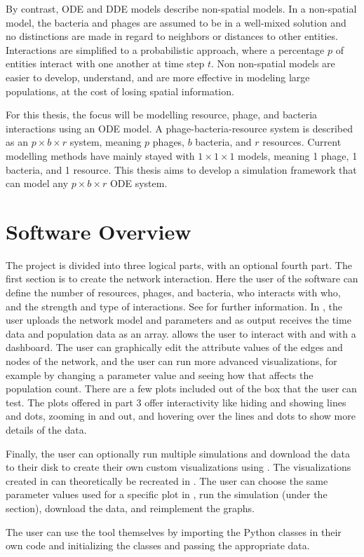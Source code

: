 By contrast, ODE and DDE models describe non-spatial models. 
In a non-spatial model, the bacteria and phages are assumed to be in a well-mixed solution and no distinctions are made in regard to neighbors or distances to other entities. 
Interactions are simplified to a probabilistic approach, where a percentage $p$ of entities interact with one another at time step $t$.
Non non-spatial models are easier to develop, understand, and are more effective in modeling large populations, at the cost of losing spatial information. 

For this thesis, the focus will be modelling resource, phage, and bacteria interactions using an ODE model. 
A phage-bacteria-resource system is described as an $p\times b \times r$ system, meaning $p$ phages, $b$ bacteria, and $r$ resources. 
Current modelling methods have mainly stayed with $1\times 1 \times 1$ models, meaning 1 phage, 1 bacteria, and 1 resource. 
This thesis aims to develop a simulation framework that can model any $p\times b \times r$ ODE system. 

\section{Software Overview}
The project is divided into three logical parts, with an optional fourth part.
The first section is to create the network interaction. 
Here the user of the software can define the number of resources, phages, and bacteria, who interacts with who, and the strength and type of interactions. See  for further information. 
In , the user uploads the network model and parameters and as output receives the time data and population data as an array. 
 allows the user to interact with  and  with a dashboard. 
The user can graphically edit the attribute values of the edges and nodes of the network, and the user can run more advanced visualizations, for example by changing a parameter value and seeing how that affects the population count. 
There are a few plots included out of the box that the user can test. 
The plots offered in part 3 offer interactivity like hiding and showing lines and dots, zooming in and out, and hovering over the lines and dots to show more details of the data. 

Finally, the user can optionally run multiple simulations and download the data to their disk to create their own custom visualizations using . 
The visualizations created in  can theoretically be recreated in . 
The user can choose the same parameter values used for a specific plot in , run the simulation (under the  section), download the data, and reimplement the graphs. 

The user can use the tool themselves by importing the Python classes in their own code and initializing the classes and passing the appropriate data. 